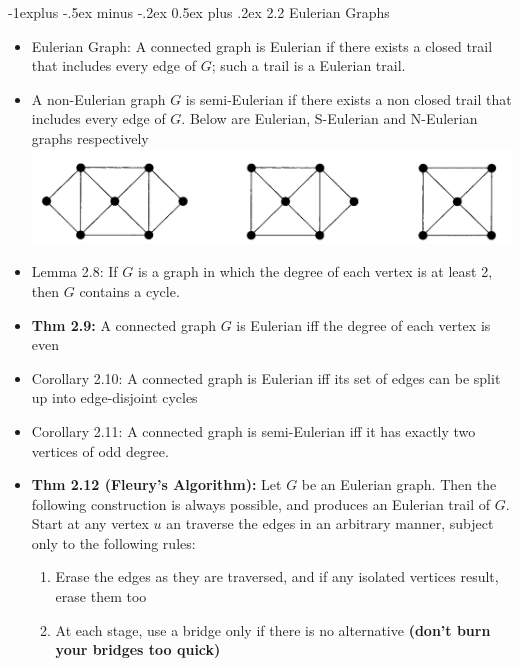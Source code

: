 \documentclass[10pt,landscape]{article}
\makeatletter
\renewcommand{\subsection}{\@startsection{subsection}{2}{0mm}%
                                {-1explus -.5ex minus -.2ex}%
                                {0.5ex plus .2ex}%
                                {\normalfont\normalsize\bfseries}}
\makeatother
\begin{document}
\begin{multicols}{2}
    \subsection{2.2 Eulerian Graphs}
\begin{itemize}
    \item Eulerian Graph: A connected graph is Eulerian if there exists a closed trail that includes every edge of $G$; such a trail is a Eulerian trail.
    \item A non-Eulerian graph $G$ is semi-Eulerian if there exists a non closed trail that includes every edge of $G$. Below are Eulerian, S-Eulerian and N-Eulerian graphs respectively\\
    \includegraphics[width = 3 cm]{Eulerian_SE_NE.png}
    \item Lemma 2.8: If $G$ is a graph in which the degree of each vertex is at least 2, then $G$ contains a cycle.
    \item \textbf{Thm 2.9:} A connected graph $G$ is Eulerian iff the degree of each vertex is even
    \item Corollary 2.10: A connected graph is Eulerian iff its set of edges can be split up into edge-disjoint cycles
    \item Corollary 2.11: A connected graph is semi-Eulerian iff it has exactly two vertices of odd degree.
    \item \textbf{Thm 2.12 (Fleury's Algorithm):} Let $G$ be an Eulerian graph. Then the following construction is always possible, and produces an Eulerian trail of $G$. Start at any vertex $u$ an traverse the edges in an arbitrary manner, subject only to the following rules:
    \begin{enumerate}
        \item Erase the edges as they are traversed, and if any isolated vertices result, erase them too 
        \item At each stage, use a bridge only if there is no alternative \textbf{(don't burn your bridges too quick)}
    \end{enumerate}


\end{itemize}
\end{multicols}
\end{document}
